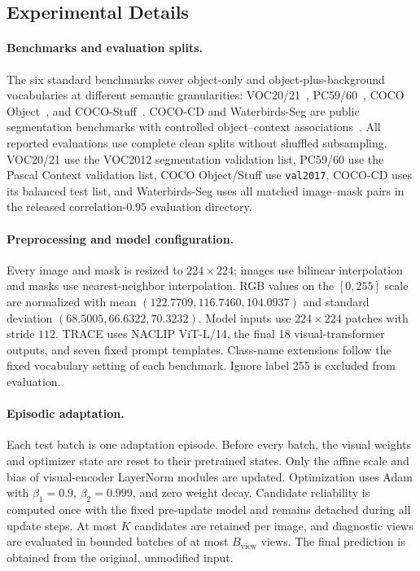 \documentclass[letterpaper]{article}
\newcommand{\method}{TRACE\xspace}
\begin{document}
\subsection{Experimental Details}
\label{sec:experimental-details}

\paragraph{Benchmarks and evaluation splits.}
The six standard benchmarks cover object-only and object-plus-background vocabularies at different semantic granularities: VOC20/21~\cite{everingham2015pascal}, PC59/60~\cite{mottaghi2014context}, COCO Object~\cite{lin2014coco}, and COCO-Stuff~\cite{caesar2018cocostuff}. COCO-CD and Waterbirds-Seg are public segmentation benchmarks with controlled object--context associations~\cite{sagawa2020dro,achara2026rightregions}. All reported evaluations use complete clean splits without shuffled subsampling. VOC20/21 use the VOC2012 segmentation validation list, PC59/60 use the Pascal Context validation list, COCO Object/Stuff use \texttt{val2017}, COCO-CD uses its balanced test list, and Waterbirds-Seg uses all matched image--mask pairs in the released correlation-$0.95$ evaluation directory.

\paragraph{Preprocessing and model configuration.}
Every image and mask is resized to $224\times224$; images use bilinear interpolation and masks use nearest-neighbor interpolation. RGB values on the $[0,255]$ scale are normalized with mean $(122.7709,116.7460,104.0937)$ and standard deviation $(68.5005,66.6322,70.3232)$. Model inputs use $224\times224$ patches with stride $112$. \method uses NACLIP ViT-L/14, the final 18 visual-transformer outputs, and seven fixed prompt templates. Class-name extensions follow the fixed vocabulary setting of each benchmark. Ignore label 255 is excluded from evaluation.

\paragraph{Episodic adaptation.}
Each test batch is one adaptation episode. Before every batch, the visual weights and optimizer state are reset to their pretrained states. Only the affine scale and bias of visual-encoder LayerNorm modules are updated. Optimization uses Adam with $\beta_1=0.9$, $\beta_2=0.999$, and zero weight decay. Candidate reliability is computed once with the fixed pre-update model and remains detached during all update steps. At most $K$ candidates are retained per image, and diagnostic views are evaluated in bounded batches of at most $B_{\mathrm{view}}$ views. The final prediction is obtained from the original, unmodified input.
\end{document}
